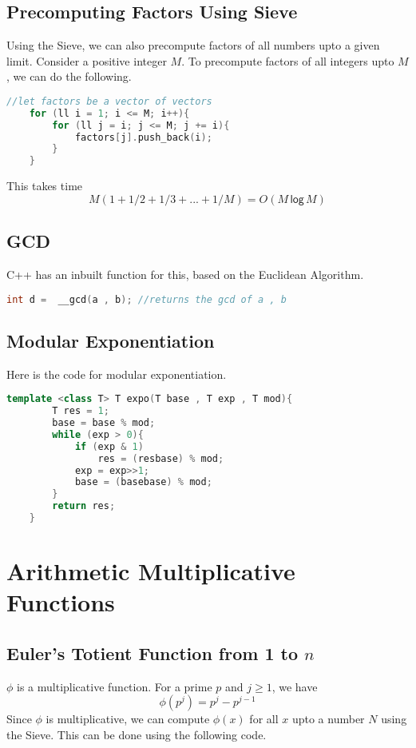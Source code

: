 \documentclass[12pt,a4paper]{amsart}
\numberwithin{equation}{section}
\theoremstyle{definition}
\begin{document}
\subsection{Precomputing Factors Using Sieve} Using the Sieve, we can also precompute factors of all numbers upto a given limit. Consider a positive integer $M$. To precompute factors of all integers upto $M$, we can do the following. 

\begin{lstlisting}[language=C++]
    //let factors be a vector of vectors
    for (ll i = 1; i <= M; i++){
        for (ll j = i; j <= M; j += i){
            factors[j].push_back(i);
        }
    }
\end{lstlisting}

This takes time 
$$M(1 + 1/2 + 1/3 + ... + 1/M) = O(M\mathsf{\,log\,}M)$$

\subsection{GCD} C++ has an inbuilt function for this, based on the Euclidean Algorithm.
\begin{lstlisting}[language=C++]
    int d =  __gcd(a , b); //returns the gcd of a , b
\end{lstlisting}

\subsection{Modular Exponentiation} Here is the code for modular exponentiation. 
\begin{lstlisting}[language=C++]
    template <class T> T expo(T base , T exp , T mod){
        T res = 1;
        base = base % mod;
        while (exp > 0){
            if (exp & 1)
                res = (resbase) % mod;
            exp = exp>>1;
            base = (basebase) % mod;
        }
        return res;
    }
\end{lstlisting}

\section{Arithmetic Multiplicative Functions}

\subsection{Euler's Totient Function from 1 to $n$} $\phi$ is a multiplicative function. For a prime $p$ and $j\ge 1$, we have 
$$\phi(p^j) = p^j - p^{j - 1}$$
Since $\phi$ is multiplicative, we can compute $\phi(x)$ for all $x$ upto a number $N$ using the Sieve. This can be done using the following code. 
\end{document}
